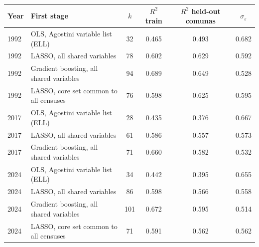 \begin{tabular}{llcccc}
\toprule
Year & First stage & $k$ & $R^2$ train & $R^2$ held-out comunas & $\sigma_\varepsilon$ \\
\midrule
1992 & OLS, Agostini variable list (ELL) & 32 & 0.465 & 0.493 & 0.682 \\
1992 & LASSO, all shared variables & 78 & 0.602 & 0.629 & 0.592 \\
1992 & Gradient boosting, all shared variables & 94 & 0.689 & 0.649 & 0.528 \\
1992 & LASSO, core set common to all censuses & 76 & 0.598 & 0.625 & 0.595 \\
2017 & OLS, Agostini variable list (ELL) & 28 & 0.435 & 0.376 & 0.667 \\
2017 & LASSO, all shared variables & 61 & 0.586 & 0.557 & 0.573 \\
2017 & Gradient boosting, all shared variables & 71 & 0.660 & 0.582 & 0.532 \\
2024 & OLS, Agostini variable list (ELL) & 34 & 0.442 & 0.395 & 0.655 \\
2024 & LASSO, all shared variables & 86 & 0.598 & 0.566 & 0.558 \\
2024 & Gradient boosting, all shared variables & 101 & 0.672 & 0.595 & 0.514 \\
2024 & LASSO, core set common to all censuses & 71 & 0.591 & 0.562 & 0.562 \\
\bottomrule
\end{tabular}
